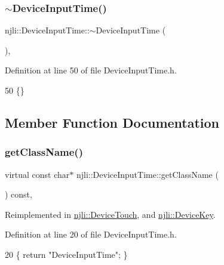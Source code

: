 \subsubsection{\texorpdfstring{$\sim$\+Device\+Input\+Time()}{~DeviceInputTime()}}
{\footnotesize\ttfamily njli\+::\+Device\+Input\+Time\+::$\sim$\+Device\+Input\+Time (\begin{DoxyParamCaption}{ }\end{DoxyParamCaption})\hspace{0.3cm}{\ttfamily [inline]}, {\ttfamily [protected]}}



Definition at line 50 of file Device\+Input\+Time.\+h.


\begin{DoxyCode}
50 \{\}
\end{DoxyCode}


\subsection{Member Function Documentation}
\mbox{\label{classnjli_1_1_device_input_time_a2e5cdadd44d1ee2d7d7136e91f2bcafb}} 
\subsubsection{\texorpdfstring{get\+Class\+Name()}{getClassName()}}
{\footnotesize\ttfamily virtual const char$\ast$ njli\+::\+Device\+Input\+Time\+::get\+Class\+Name (\begin{DoxyParamCaption}{ }\end{DoxyParamCaption}) const\hspace{0.3cm}{\ttfamily [inline]}, {\ttfamily [virtual]}}



Reimplemented in \mbox{\hyperlink{classnjli_1_1_device_touch_a0bf7b53fef161666e8c70bf2482be1c8}{njli\+::\+Device\+Touch}}, and \mbox{\hyperlink{classnjli_1_1_device_key_a14f6e0865bbf44c100b34448e9d67f24}{njli\+::\+Device\+Key}}.



Definition at line 20 of file Device\+Input\+Time.\+h.


\begin{DoxyCode}
20 \{ \textcolor{keywordflow}{return} \textcolor{stringliteral}{"DeviceInputTime"}; \}
\end{DoxyCode}
\mbox{\label{classnjli_1_1_device_input_time_ad5e181aebc12a0f9c662a9af1d559bd9}} 
